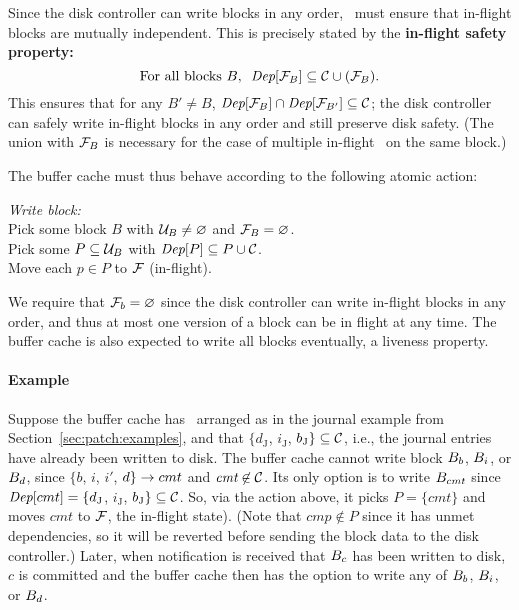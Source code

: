 Since the disk controller can write blocks in any order, \Kudos\ must ensure
that in-flight blocks are mutually independent.  This is precisely stated
by the \textbf{in-flight safety property:}
%
\[ \text{For all blocks $B$,~~} \PDepset{\PInf[B]} \subseteq \PDisk \cup (\PInf[B]) . \]
%
This ensures that for any $B' \neq B$, $\PDepset{\PInf[B]} \cap
 \PDepset{\PInf[B']} \subseteq \PDisk$; the disk controller can safely
 write in-flight blocks in any order and still preserve disk safety.
%
(The union with $\PInf[B]$ is necessary for the case of multiple in-flight
\patches\ on the same block.)


The buffer cache must thus behave according to the following atomic action:

\begin{tabbing}
\quad \textit{Write block:} \\
\quad \quad Pick some block $B$ with $\PMem[B] \neq \emptyset$ and $\PInf[B] =
\emptyset$. \\
\quad \quad Pick some $P \subseteq \PMem[B]$ with $\PDepset{P} \subseteq P \cup
\PDisk$. \\
\quad \quad Move each $p \in P$ to $\PInf$ (in-flight).
\end{tabbing}

\noindent
%
We require that $\PInf[b] = \emptyset$ since the disk controller can write
in-flight blocks in any order, and thus at most one version of a block can
be in flight at any time.
%
The buffer cache is also expected to write all blocks eventually, a
 liveness property.

\paragraph{Example}
%
Suppose the buffer cache has \patches\ arranged as in the journal example from
Section~\ref{sec:patch:examples}, and that $\{d_\textrm{J}$, $i_\textrm{J}$,
$b_\textrm{J}\} \subseteq \PDisk$, i.e., the journal entries have already been
written to disk.
%
The buffer cache cannot write block $B_{b}$, $B_{i}$, or $B_{d}$,
since $\{b$, $i$, $i'$, $d\} \rightarrow cmt$ and $\textit{cmt} \not\in \PDisk$.
%
Its only option is to write $B_{cmt}$ since $\textit{Dep}[cmt] =
\{d_\textrm{J}$, $i_\textrm{J}$, $b_\textrm{J}\} \subseteq \PDisk$.
%
So, via the action above, it picks $P = \{cmt\}$ and moves $\textit{cmt}$
to $\PInf$, the in-flight state). (Note that $cmp \not \in P$ since it has unmet dependencies, so it
will be reverted before sending the block data to the disk controller.)
%
Later, when notification is received that $B_{c}$ has been written to disk,
$c$ is committed and the buffer cache then has the option to
write any of $B_{b}$, $B_{i}$, or $B_{d}$.


